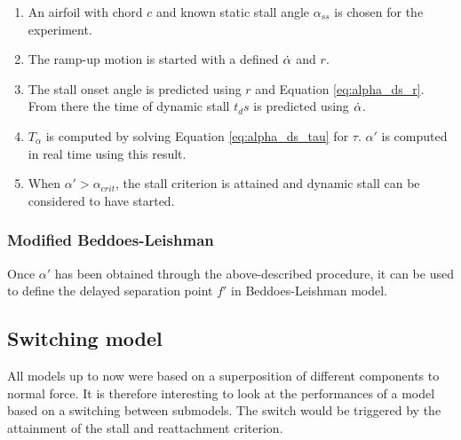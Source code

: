 \begin{enumerate}
\item An airfoil with chord $c$ and known static stall angle $\alpha_{ss}$ is chosen for the experiment. 
\item The ramp-up motion is started with a defined $\dot{\alpha}$ and $r$.
\item The stall onset angle is predicted using $r$ and Equation \eqref{eq:alpha_ds_r}. From there the time of dynamic stall $t_ds$ is predicted using $\dot{\alpha}$.
\item $T_\alpha$ is computed by solving Equation  \eqref{eq:alpha_ds_tau} for $\tau$. $\alpha'$ is computed in real time using this result. 
\item When $\alpha' > \alpha_{crit}$, the stall criterion is attained and dynamic stall can be considered to have started. 
\end{enumerate}

\subsubsection{Modified Beddoes-Leishman}

Once $\alpha'$ has been obtained through the above-described procedure, it can be used to define the delayed separation point $f'$ in Beddoes-Leishman model.   

\subsection{Switching model}

All models up to now were based on a superposition of different components to normal force. It is therefore interesting to look at the performances of a model based on a switching between submodels. The switch would be triggered by the attainment of the stall and reattachment criterion.